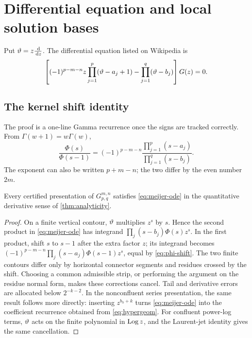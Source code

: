\section{Differential equation and local solution bases}\label{sec:ode}

Put $\vartheta=z\frac{\,\mathrm d}{\,\mathrm d z}$.  The differential equation listed on
Wikipedia is
\begin{equation}\label{eq:meijer-ode}
 \left[(-1)^{p-m-n}z\prod_{j=1}^{p}(\vartheta-a_j+1)
       -\prod_{j=1}^{q}(\vartheta-b_j)\right]G(z)=0.
\end{equation}

\subsection{The kernel shift identity}

The proof is a one-line Gamma recurrence once the signs are tracked correctly.
From $\Gamma(w+1)=w\Gamma(w)$,
\begin{equation}\label{eq:phi-shift}
 \frac{\Phi(s)}{\Phi(s-1)}
 =(-1)^{p-m-n}
   \frac{\prod_{j=1}^{p}(s-a_j)}
        {\prod_{j=1}^{q}(s-b_j)}.
\end{equation}
The exponent can also be written $p+m-n$; the two differ by the even number
$2m$.

\begin{theorem}\label{thm:ode}
Every certified presentation of $G_{p,q}^{m,n}$ satisfies
\eqref{eq:meijer-ode} in the quantitative derivative sense of
\cref{thm:analyticity}.
\end{theorem}
\begin{proof}
On a finite vertical contour, $\vartheta$ multiplies $z^s$ by $s$.  Hence the
second product in \eqref{eq:meijer-ode} has integrand
$\prod_j(s-b_j)\Phi(s)z^s$.  In the first product, shift $s$ to $s-1$ after the
extra factor $z$; its integrand becomes
$(-1)^{p-m-n}\prod_j(s-a_j)\Phi(s-1)z^s$, equal by
\eqref{eq:phi-shift}.  The two finite contours differ only by horizontal
connector segments and residues crossed by the shift.  Choosing a common
admissible strip, or performing the argument on the residue normal form, makes
these corrections cancel.  Tail and derivative errors are allocated below
$2^{-k-2}$.  In the nonconfluent series presentation, the same result follows
more directly: inserting $z^{b_h+k}$ turns \eqref{eq:meijer-ode} into the
coefficient recurrence obtained from \eqref{eq:hypergeom}.  For confluent
power-log terms, $\vartheta$ acts on the finite polynomial in $\operatorname{Log} z$, and the
Laurent-jet identity gives the same cancellation.
\end{proof}

